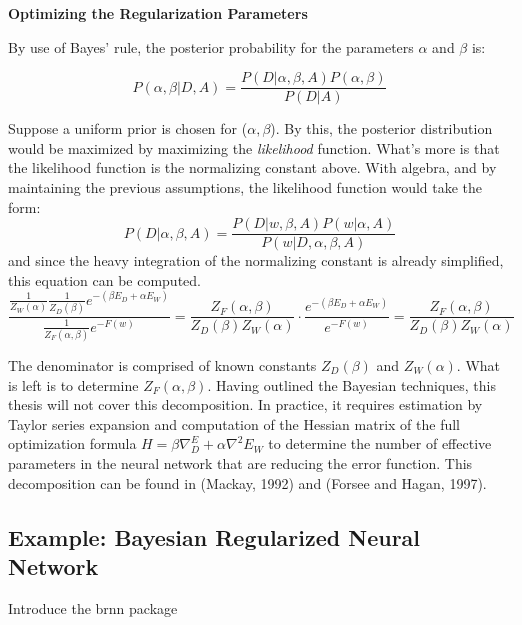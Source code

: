 \textbf{Optimizing the Regularization Parameters}

By use of Bayes' rule, the posterior probability for the parameters $\alpha$ and $\beta$ is:

$$
P(\alpha, \beta | D,A) = \frac{P(D|\alpha,\beta,A) P(\alpha,\beta)}{P(D|A)}
$$



Suppose a uniform prior is chosen for ($\alpha,\beta$).  By this, the posterior distribution would be maximized by maximizing the \textit{likelihood} function.  What's more is that the likelihood function is the normalizing constant above.  With algebra, and by maintaining the previous assumptions, the likelihood function would take the form:
$$
P(D|\alpha,\beta,A) = \frac{P(D|w,\beta,A) P(w|\alpha,A)}{P(w|D,\alpha,\beta,A)}
$$
and since the heavy integration of the normalizing constant is already simplified, this equation can be computed.
$$
\frac{\frac{1}{Z_W(\alpha)} \frac{1}{Z_D(\beta)} e^{-(\beta E_D + \alpha E_W)}}{\frac{1}{Z_F(\alpha,\beta)} e^{-F(w)}} = \frac{Z_F(\alpha,\beta)}{Z_D(\beta) Z_W(\alpha)} \cdot \frac{e^{-(\beta E_D + \alpha E_W)}}{e^{-F(w)}} = \frac{Z_F(\alpha,\beta)}{Z_D(\beta) Z_W(\alpha)}
$$

The denominator is comprised of known constants $Z_D(\beta)$ and $Z_W(\alpha)$.  What is left is to determine $Z_F(\alpha,\beta)$.  Having outlined the Bayesian techniques, this thesis will not cover this decomposition.  In practice, it requires estimation by Taylor series expansion and computation of the Hessian matrix of the full optimization formula $H = \beta \nabla^ E_D + \alpha \nabla^2 E_W$ to determine the number of effective parameters in the neural network that are reducing the error function.  This decomposition can be found in (Mackay, 1992) and (Forsee and Hagan, 1997).


\begin{comment}
Through \textbf{margialization}, the true posterior $P(w|D,A)$ is obtained by integrating out $\alpha$ and $\beta$:
$$
P(w|D,A) = \int P(w|D,\alpha,\beta,A) P(\alpha, \beta | D,A) \text{ } d\alpha \text{ } d\beta
$$
\end{comment}

\subsection{Example: Bayesian Regularized Neural Network}

Introduce the brnn package

